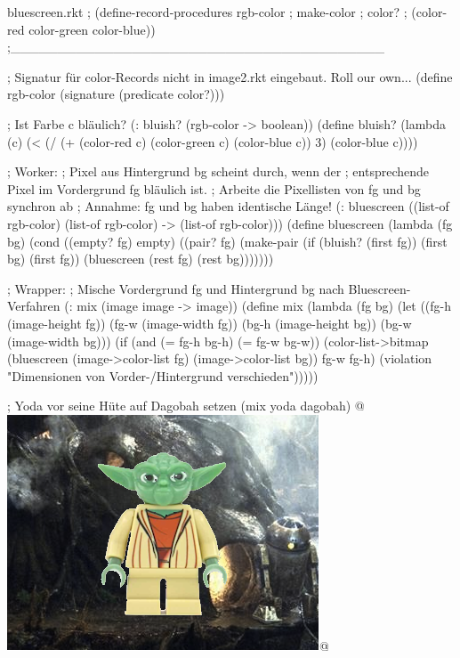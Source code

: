 \begin{filecontents*}{bluescreen.rkt}
; (define-record-procedures rgb-color
;   make-color
;   color?
;   (color-red color-green color-blue))
;________________________________________

; Signatur für color-Records nicht in image2.rkt eingebaut.  Roll our own...
(define rgb-color
  (signature (predicate color?)))


; Ist Farbe c bläulich?
(: bluish? (rgb-color -> boolean))
(define bluish?
  (lambda (c)
    (< (/ (+ (color-red c) (color-green c) (color-blue c))
          3)
       (color-blue c))))

; Worker:
; Pixel aus Hintergrund bg scheint durch, wenn der
; entsprechende Pixel im Vordergrund fg bläulich ist.
; Arbeite die Pixellisten von fg und bg synchron ab
; Annahme: fg und bg haben identische Länge!
(: bluescreen ((list-of rgb-color) (list-of rgb-color) -> (list-of rgb-color)))
(define bluescreen
  (lambda (fg bg)
    (cond ((empty? fg)
           empty)
          ((pair? fg)
           (make-pair 
            (if (bluish? (first fg))
                (first bg)
                (first fg))
            (bluescreen (rest fg) (rest bg)))))))

; Wrapper:
; Mische Vordergrund fg und Hintergrund bg nach Bluescreen-Verfahren
(: mix (image image -> image))
(define mix
  (lambda (fg bg)
    (let ((fg-h (image-height fg))
          (fg-w (image-width fg))
          (bg-h (image-height bg))
          (bg-w (image-width bg)))
      (if (and (= fg-h bg-h)
               (= fg-w bg-w))
          (color-list->bitmap
           (bluescreen (image->color-list fg)
                       (image->color-list bg))
           fg-w
           fg-h)
          (violation "Dimensionen von Vorder-/Hintergrund verschieden")))))

; Yoda vor seine Hüte auf Dagobah setzen
(mix yoda dagobah) @\eval \ \includegraphics[scale=0.5]{Yoda_finished}@
\end{filecontents*}
